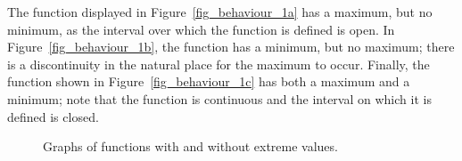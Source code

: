 
The function displayed in Figure~\ref{fig_behaviour_1a} has a maximum, but no minimum, as the interval over which the function is defined is open. In Figure~\ref{fig_behaviour_1b}, the function has a minimum, but no maximum; there is a discontinuity in the natural place for the maximum to occur. Finally, the function shown in Figure~\ref{fig_behaviour_1c} has both a maximum and a minimum; note that the function is continuous and the interval on which it is defined is closed. 

\begin{figure}[H]
\centering
\qquad
{}
\qquad
{}
\caption{Graphs of functions with and without extreme values. }
\end{figure}

